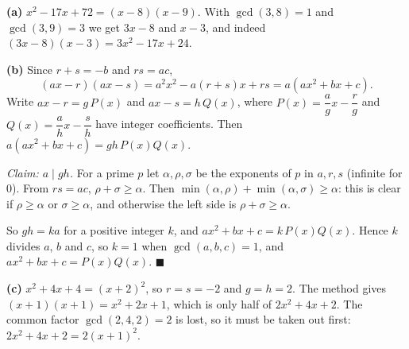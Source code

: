 \textbf{(a)} $x^2-17x+72=(x-8)(x-9)$. With $\gcd(3,8)=1$ and $\gcd(3,9)=3$ we get $3x-8$ and $x-3$, and indeed $(3x-8)(x-3)=3x^2-17x+24$.

\textbf{(b)} Since $r+s=-b$ and $rs=ac$,
\[(ax-r)(ax-s)=a^2x^2-a(r+s)x+rs=a\left(ax^2+bx+c\right).\]
Write $ax-r=g\,P(x)$ and $ax-s=h\,Q(x)$, where $P(x)=\dfrac agx-\dfrac rg$ and $Q(x)=\dfrac ahx-\dfrac sh$ have integer coefficients. Then $a\left(ax^2+bx+c\right)=gh\,P(x)Q(x)$.

\emph{Claim: $a\mid gh$.} For a prime $p$ let $\alpha,\rho,\sigma$ be the exponents of $p$ in $a,r,s$ (infinite for $0$). From $rs=ac$, $\rho+\sigma\ge\alpha$. Then $\min(\alpha,\rho)+\min(\alpha,\sigma)\ge\alpha$: this is clear if $\rho\ge\alpha$ or $\sigma\ge\alpha$, and otherwise the left side is $\rho+\sigma\ge\alpha$.

So $gh=ka$ for a positive integer $k$, and $ax^2+bx+c=k\,P(x)Q(x)$. Hence $k$ divides $a$, $b$ and $c$, so $k=1$ when $\gcd(a,b,c)=1$, and $ax^2+bx+c=P(x)Q(x)$. $\blacksquare$

\textbf{(c)} $x^2+4x+4=(x+2)^2$, so $r=s=-2$ and $g=h=2$. The method gives $(x+1)(x+1)=x^2+2x+1$, which is only half of $2x^2+4x+2$. The common factor $\gcd(2,4,2)=2$ is lost, so it must be taken out first: $2x^2+4x+2=2(x+1)^2$.
